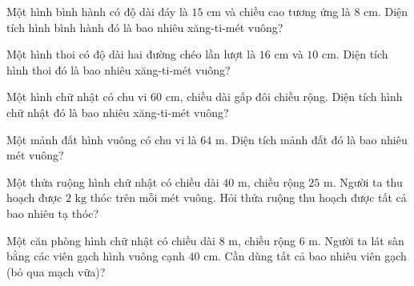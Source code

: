 \begin{ex}
  Một hình bình hành có độ dài đáy là $15\text{ cm}$ và chiều cao tương ứng là $8\text{ cm}$. Diện tích hình bình hành đó là bao nhiêu xăng-ti-mét vuông?
\end{ex}

\begin{ex}
  Một hình thoi có độ dài hai đường chéo lần lượt là $16\text{ cm}$ và $10\text{ cm}$. Diện tích hình thoi đó là bao nhiêu xăng-ti-mét vuông?
\end{ex}

\begin{ex}
  Một hình chữ nhật có chu vi $60\text{ cm}$, chiều dài gấp đôi chiều rộng. Diện tích hình chữ nhật đó là bao nhiêu xăng-ti-mét vuông?
\end{ex}

\begin{ex}
  Một mảnh đất hình vuông có chu vi là $64\text{ m}$. Diện tích mảnh đất đó là bao nhiêu mét vuông?
\end{ex}

\begin{ex}
  Một thửa ruộng hình chữ nhật có chiều dài $40\text{ m}$, chiều rộng $25\text{ m}$. Người ta thu hoạch được $2\text{ kg}$ thóc trên mỗi mét vuông. Hỏi thửa ruộng thu hoạch được tất cả bao nhiêu tạ thóc?
\end{ex}

\begin{ex}
  Một căn phòng hình chữ nhật có chiều dài $8\text{ m}$, chiều rộng $6\text{ m}$. Người ta lát sàn bằng các viên gạch hình vuông cạnh $40\text{ cm}$. Cần dùng tất cả bao nhiêu viên gạch (bỏ qua mạch vữa)?
\end{ex}

